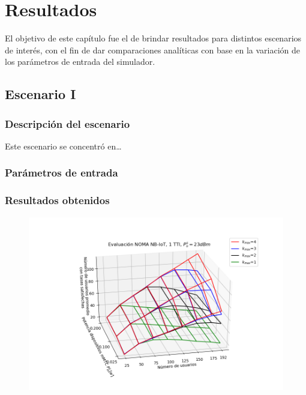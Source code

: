 
\chapter{Resultados} %

\label{Chapter7} %

El objetivo de este capítulo fue el de brindar resultados para distintos escenarios de interés, con el fin de dar comparaciones analíticas con base en la variación de los parámetros de entrada del simulador.


\section{Escenario I} %
\subsection{Descripción del escenario}
Este escenario se concentró en\dots

\subsection{Parámetros de entrada}


\subsection{Resultados obtenidos}

\begin{figure}[th]
    \centering
    \includegraphics[scale=.7]{Figures/ResultadosNOMA/NOMA_evaluacion_K_Pm_Variable_3D.png}
    \decoRule
    \caption[]{}
    \label{fig:}
\end{figure}

